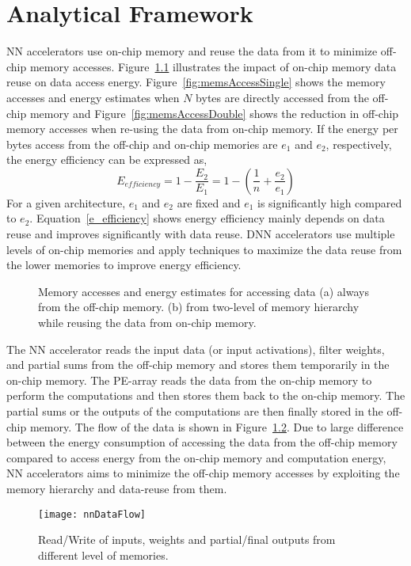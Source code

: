 \graphicspath{{./Ch2-AnalyticalFw/images/}}

\chapter{Analytical Framework} \label{chap:analyticalFw}
NN accelerators use on-chip memory and reuse the data from it to minimize off-chip memory accesses. Figure~\ref{fig:memsAccess} illustrates the impact of on-chip memory data reuse on data access energy. Figure~\ref{fig:memsAccessSingle} shows the memory accesses and energy estimates when $N$ bytes are directly accessed from the off-chip memory and Figure~\ref{fig:memsAccessDouble} shows the reduction in off-chip memory accesses when re-using the data from on-chip memory. If the energy per bytes access from the off-chip and on-chip memories are $e_{1}$ and $e_{2}$, respectively, the energy efficiency can be expressed as, 
\begin{equation}\label{e_efficiency} 
	E_{efficiency}=1-\frac{E_2}{E_1}=1-(\frac{1}{n}+\frac{e_{2}}{e_{1}})
\end{equation}
For a given architecture, $e_{1}$ and $e_{2}$ are fixed and $e_1$ is significantly high compared to $e_2$. Equation~\ref{e_efficiency} shows energy efficiency mainly depends on data reuse and improves significantly with data reuse. DNN accelerators use multiple levels of on-chip memories and apply techniques to maximize the data reuse from the lower memories to improve energy efficiency. 
\begin{figure}[!htb]
	\centering
	\captionsetup{font=sf}
	\hfil	
	\hfil	
	\caption{Memory accesses and energy estimates for accessing data (a) always from the off-chip memory. (b) from two-level of memory hierarchy while reusing the data from on-chip memory.}
	\label{fig:memsAccess}
\end{figure}

The NN accelerator reads the input data (or input activations), filter weights, and partial sums from the off-chip memory and stores them temporarily in the on-chip memory. The PE-array reads the data from the on-chip memory to perform the computations and then stores them back to the on-chip memory. The partial sums or the outputs of the computations are then finally stored in the off-chip memory. The flow of the data is shown in Figure~\ref{fig:nnDataFlow}. Due to large difference between the energy consumption of accessing the data from the off-chip memory compared to access energy from the on-chip memory and computation energy, NN accelerators aims to minimize the off-chip memory accesses by exploiting the memory hierarchy and data-reuse from them.
\begin{figure}[!htb]
	\centering
	\captionsetup{font=sf}	
	\texttt{[image: nnDataFlow]}
	\caption{Read/Write of inputs, weights and partial/final outputs from different level of memories.}
	\label{fig:nnDataFlow}
\end{figure}

